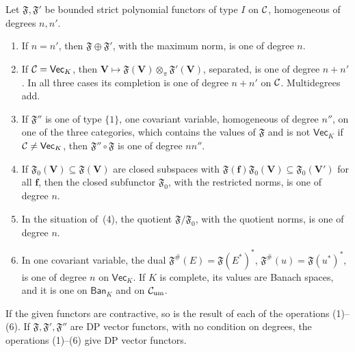 \begin{proposition}[closure]\label{dp:prop:functor-closure}
Let $\mathfrak F,\mathfrak F'$ be bounded strict polynomial functors of type $I$ on $\mathcal{C}$, homogeneous of degrees $n,n'$.
\begin{enumerate}
\item If $n=n'$, then $\mathfrak F\oplus\mathfrak F'$, with the maximum norm, is one of degree $n$.
\item If $\mathcal{C}=\mathsf{Vec}_K$, then $\mathbf V\mapsto\mathfrak F(\mathbf V)\otimes_\pi\mathfrak F'(\mathbf V)$, separated, is one of degree $n+n'$. In all three cases its completion is one of degree $n+n'$ on $\mathcal{C}$. Multidegrees add.
\item If $\mathfrak F''$ is one of type $\{1\}$, one covariant variable, homogeneous of degree $n''$, on one of the three categories, which contains the values of $\mathfrak F$ and is not $\mathsf{Vec}_K$ if $\mathcal{C}\ne\mathsf{Vec}_K$, then $\mathfrak F''\circ\mathfrak F$ is one of degree $nn''$.
\item If $\mathfrak F_0(\mathbf V)\subseteq\mathfrak F(\mathbf V)$ are closed subspaces with $\mathfrak F(\mathbf f)\mathfrak F_0(\mathbf V)\subseteq\mathfrak F_0(\mathbf V')$ for all $\mathbf f$, then the closed subfunctor $\mathfrak F_0$, with the restricted norms, is one of degree $n$.
\item In the situation of~(4), the quotient $\mathfrak F/\mathfrak F_0$, with the quotient norms, is one of degree $n$.
\item In one covariant variable, the dual $\mathfrak F^\#(E)=\mathfrak F(E^*)^*$, $\mathfrak F^\#(u)=\mathfrak F(u^*)^*$, is one of degree $n$ on $\mathsf{Vec}_K$. If $K$ is complete, its values are Banach spaces, and it is one on $\mathsf{Ban}_K$ and on $\mathcal{C}_{\rm um}$.
\end{enumerate}
If the given functors are contractive, so is the result of each of the operations \textup{(1)--(6)}. If $\mathfrak F,\mathfrak F',\mathfrak F''$ are DP vector functors, with no condition on degrees, the operations \textup{(1)--(6)} give DP vector functors.
\end{proposition}

